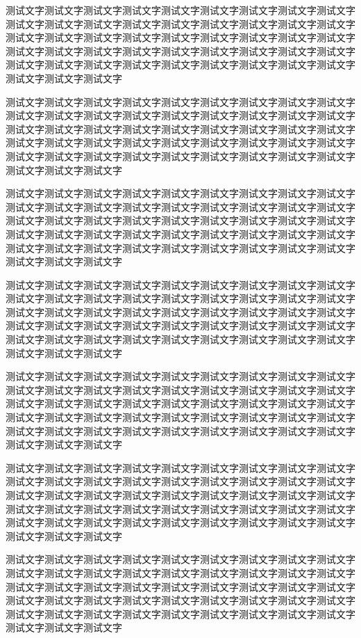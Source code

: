 \begin{QuestionItem}[2]
	\item 测试文字测试文字测试文字测试文字测试文字测试文字测试文字测试文字测试文字测试文字测试文字测试文字测试文字测试文字测试文字测试文字测试文字测试文字测试文字测试文字测试文字测试文字测试文字测试文字测试文字测试文字测试文字测试文字测试文字测试文字测试文字测试文字测试文字测试文字测试文字测试文字测试文字测试文字测试文字测试文字测试文字测试文字测试文字测试文字测试文字测试文字测试文字测试文字
	\item 测试文字测试文字测试文字测试文字测试文字测试文字测试文字测试文字测试文字测试文字测试文字测试文字测试文字测试文字测试文字测试文字测试文字测试文字测试文字测试文字测试文字测试文字测试文字测试文字测试文字测试文字测试文字测试文字测试文字测试文字测试文字测试文字测试文字测试文字测试文字测试文字测试文字测试文字测试文字测试文字测试文字测试文字测试文字测试文字测试文字测试文字测试文字测试文字
	\item 测试文字测试文字测试文字测试文字测试文字测试文字测试文字测试文字测试文字测试文字测试文字测试文字测试文字测试文字测试文字测试文字测试文字测试文字测试文字测试文字测试文字测试文字测试文字测试文字测试文字测试文字测试文字测试文字测试文字测试文字测试文字测试文字测试文字测试文字测试文字测试文字测试文字测试文字测试文字测试文字测试文字测试文字测试文字测试文字测试文字测试文字测试文字测试文字
	\item 测试文字测试文字测试文字测试文字测试文字测试文字测试文字测试文字测试文字测试文字测试文字测试文字测试文字测试文字测试文字测试文字测试文字测试文字测试文字测试文字测试文字测试文字测试文字测试文字测试文字测试文字测试文字测试文字测试文字测试文字测试文字测试文字测试文字测试文字测试文字测试文字测试文字测试文字测试文字测试文字测试文字测试文字测试文字测试文字测试文字测试文字测试文字测试文字
	\item 测试文字测试文字测试文字测试文字测试文字测试文字测试文字测试文字测试文字测试文字测试文字测试文字测试文字测试文字测试文字测试文字测试文字测试文字测试文字测试文字测试文字测试文字测试文字测试文字测试文字测试文字测试文字测试文字测试文字测试文字测试文字测试文字测试文字测试文字测试文字测试文字测试文字测试文字测试文字测试文字测试文字测试文字测试文字测试文字测试文字测试文字测试文字测试文字
	\item 测试文字测试文字测试文字测试文字测试文字测试文字测试文字测试文字测试文字测试文字测试文字测试文字测试文字测试文字测试文字测试文字测试文字测试文字测试文字测试文字测试文字测试文字测试文字测试文字测试文字测试文字测试文字测试文字测试文字测试文字测试文字测试文字测试文字测试文字测试文字测试文字测试文字测试文字测试文字测试文字测试文字测试文字测试文字测试文字测试文字测试文字测试文字测试文字
	\item 测试文字测试文字测试文字测试文字测试文字测试文字测试文字测试文字测试文字测试文字测试文字测试文字测试文字测试文字测试文字测试文字测试文字测试文字测试文字测试文字测试文字测试文字测试文字测试文字测试文字测试文字测试文字测试文字测试文字测试文字测试文字测试文字测试文字测试文字测试文字测试文字测试文字测试文字测试文字测试文字测试文字测试文字测试文字测试文字测试文字测试文字测试文字测试文字

\end{QuestionItem}

